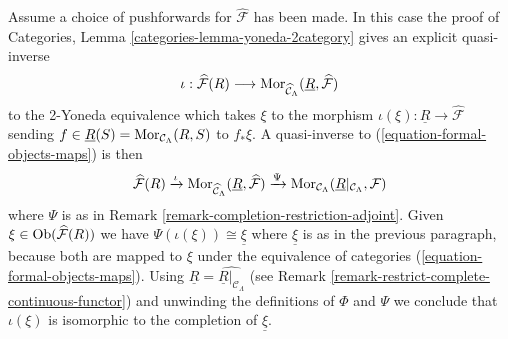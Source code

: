 \begin{remark}
\medskip\noindent
Assume a choice of pushforwards for $\widehat{\mathcal{F}}$ has been made.
In this case the proof of
Categories, Lemma \ref{categories-lemma-yoneda-2category}
gives an explicit quasi-inverse
$$
\iota :
\widehat{\mathcal{F}}(R) \longrightarrow
\mathop{\mathrm{Mor}}\nolimits_{\widehat{\mathcal{C}}_\Lambda}(
\underline{R}, \widehat{\mathcal{F}})
$$
to the 2-Yoneda equivalence which takes $\xi$ to the morphism
$\iota(\xi) : \underline{R} \to \widehat{\mathcal{F}}$ sending
$f \in \underline{R}(S) = \mathop{\mathrm{Mor}}\nolimits_{\mathcal{C}_\Lambda}(R, S)$
to $f_*\xi$. A quasi-inverse to (\ref{equation-formal-objects-maps})
is then
$$
\widehat{\mathcal{F}}(R)
\xrightarrow{\iota}
\mathop{\mathrm{Mor}}\nolimits_{\widehat{\mathcal{C}}_\Lambda}(
\underline{R}, \widehat{\mathcal{F}})
\xrightarrow{\Psi}
\mathop{\mathrm{Mor}}\nolimits_{\mathcal{C}_\Lambda}(
\underline{R}|_{\mathcal{C}_\Lambda}, \mathcal{F})
$$
where $\Psi$ is as in
Remark \ref{remark-completion-restriction-adjoint}.
Given $\xi \in \mathop{\mathrm{Ob}}\nolimits(\widehat{\mathcal{F}}(R))$ we have
$\Psi(\iota(\xi)) \cong \underline{\xi}$ where $\underline{\xi}$
is as in the previous paragraph, because both are mapped to $\xi$
under the equivalence of categories (\ref{equation-formal-objects-maps}).
Using $\underline{R} = \widehat{\underline{R}|_{\mathcal{C}_\Lambda}}$
(see Remark \ref{remark-restrict-complete-continuous-functor})
and unwinding the definitions of $\Phi$ and $\Psi$ we conclude that
$\iota(\xi)$ is isomorphic to the completion of $\underline{\xi}$.
\end{remark}

